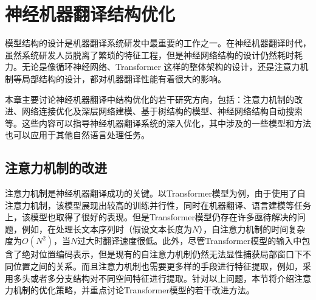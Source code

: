 
%


\renewcommand\figurename{图}%
\renewcommand\tablename{表}%


\chapter{神经机器翻译结构优化}

\parinterval 模型结构的设计是机器翻译系统研发中最重要的工作之一。在神经机器翻译时代，虽然系统研发人员脱离了繁琐的特征工程，但是神经网络结构的设计仍然耗时耗力。无论是像循环神经网络、Transformer 这样的整体架构的设计，还是注意力机制等局部结构的设计，都对机器翻译性能有着很大的影响。

\parinterval 本章主要讨论神经机器翻译中结构优化的若干研究方向，包括：注意力机制的改进、网络连接优化及深层网络建模、基于树结构的模型、神经网络结构自动搜索等。这些内容可以指导神经机器翻译系统的深入优化，其中涉及的一些模型和方法也可以应用于其他自然语言处理任务。


\sectionnewpage
\section{注意力机制的改进}

\parinterval 注意力机制是神经机器翻译成功的关键。以Transformer模型为例，由于使用了自注意力机制，该模型展现出较高的训练并行性，同时在机器翻译、语言建模等任务上，该模型也取得了很好的表现。但是Transformer模型仍存在许多亟待解决的问题，例如，在处理长文本序列时（假设文本长度为$N$），自注意力机制的时间复杂度为$O(N^2)$，当$N$过大时翻译速度很低。此外，尽管Transformer模型的输入中包含了绝对位置编码表示，但是现有的自注意力机制仍然无法显性捕获局部窗口下不同位置之间的关系。而且注意力机制也需要更多样的手段进行特征提取，例如，采用多头或者多分支结构对不同空间特征进行提取。针对以上问题，本节将介绍注意力机制的优化策略，并重点讨论Transformer模型的若干改进方法。

